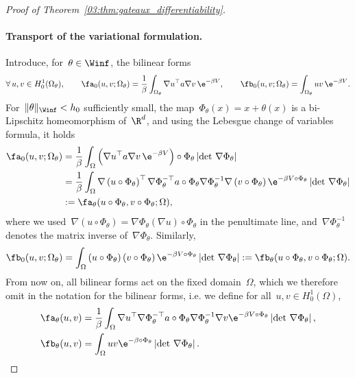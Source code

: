 \begin{proof}[Proof of Theorem~\ref{03:thm:gateaux_differentiability}]
    \paragraph{Transport of the variational formulation.}
    Introduce, for~$\theta\in\Winf$, the bilinear forms
    \begin{equation}
        \label{03:eq:bilinear_forms_0}
        \forall\,u,v\in H_0^1(\Omega_\theta),\qquad \fa_0(u,v;\Omega_\theta) = \frac1\beta\int_{\Omega_\theta}\nabla u^\top a \nabla v \,\e^{-\beta V},\qquad \fb_0(u,v;\Omega_\theta) = \int_{\Omega_\theta}uv\,\e^{-\beta V}.
    \end{equation}
    For~$\|\theta\|_{\Winf}<h_0$ sufficiently small, the map~$\Phi_\theta(x) = x + \theta(x)$ is a bi-Lipschitz homeomorphism of~$\R^d$, and using the Lebesgue change of variables formula, it holds
    \begin{equation}
        \begin{aligned}
        \fa_0(u,v;\Omega_\theta) &= \frac1\beta \int_{\Omega}\left(\nabla u^\top a \nabla v\,\e^{-\beta V}\right)\circ \Phi_\theta \left|\det\,\nabla \Phi_\theta\right|\\
        &=\frac1\beta\int_\Omega \nabla\left(u\circ \Phi_\theta\right)^\top \nabla \Phi_\theta^{-\top}a\circ \Phi_\theta \nabla \Phi_\theta^{-1}\nabla\left(v\circ\Phi_\theta\right)\e^{-\beta V\circ\Phi_\theta}\left|\det\,\nabla\Phi_\theta\right|\\
        &:=\fa_\theta(u\circ \Phi_\theta,v\circ\Phi_\theta;\Omega),
        \end{aligned}
    \end{equation}
    where we used~$\nabla\left(u\circ\Phi_\theta\right)=\nabla \Phi_\theta \left(\nabla u\right)\circ\Phi_\theta$ in the penultimate line, and~$\nabla \Phi_\theta^{-1}$ denotes the matrix inverse of~$\nabla \Phi_\theta$.
    Similarly,
    \begin{equation}
        \fb_0(u,v;\Omega_\theta) = \int_\Omega \left(u\circ\Phi_\theta\right) \left(v\circ\Phi_\theta\right) \e^{-\beta V\circ \Phi_\theta}\left|\det\,\nabla \Phi_\theta\right| := \fb_\theta(u\circ\Phi_\theta,v\circ\Phi_\theta;\Omega).
    \end{equation}
    From now on, all bilinear forms act on the fixed domain~$\Omega$, which we therefore omit in the notation for the bilinear forms, i.e. we define for all~$u,v\in H_0^1(\Omega)$,
    \begin{equation}
        \label{03:eq:bilinear_forms}
        \begin{split}
        \fa_\theta(u,v) &= \frac1\beta\int_\Omega \nabla u^\top \nabla \Phi_\theta^{-\top}a\circ \Phi_\theta \nabla \Phi_\theta^{-1}\nabla v\e^{-\beta V\circ\Phi_\theta}\left|\det\,\nabla\Phi_\theta\right|,\\
         \fb_\theta(u,v) &= \int_\Omega uv\e^{-\beta \circ \Phi_\theta}\left|\det\,\nabla\Phi_\theta\right|.
        \end{split}
    \end{equation}


\end{proof}
